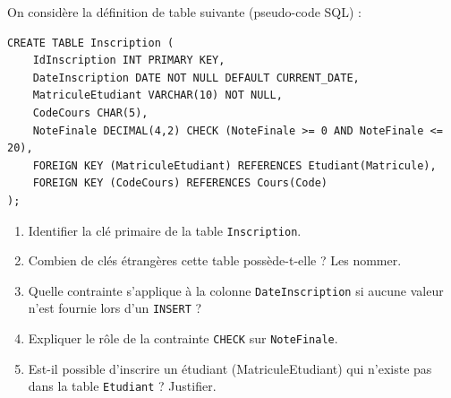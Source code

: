 \documentclass[11pt]{article}
\begin{document}
\begin{exercice}
On considère la définition de table suivante (pseudo-code SQL) :
\begin{verbatim}
CREATE TABLE Inscription (
    IdInscription INT PRIMARY KEY,
    DateInscription DATE NOT NULL DEFAULT CURRENT_DATE,
    MatriculeEtudiant VARCHAR(10) NOT NULL,
    CodeCours CHAR(5),
    NoteFinale DECIMAL(4,2) CHECK (NoteFinale >= 0 AND NoteFinale <= 20),
    FOREIGN KEY (MatriculeEtudiant) REFERENCES Etudiant(Matricule),
    FOREIGN KEY (CodeCours) REFERENCES Cours(Code)
);
\end{verbatim}
\begin{enumerate}
    \item Identifier la clé primaire de la table \texttt{Inscription}.
    \item Combien de clés étrangères cette table possède-t-elle ? Les nommer.
    \item Quelle contrainte s'applique à la colonne \texttt{DateInscription} si aucune valeur n'est fournie lors d'un \texttt{INSERT} ?
    \item Expliquer le rôle de la contrainte \texttt{CHECK} sur \texttt{NoteFinale}.
    \item Est-il possible d'inscrire un étudiant (MatriculeEtudiant) qui n'existe pas dans la table \texttt{Etudiant} ? Justifier.
\end{enumerate}
\end{exercice}
\end{document}
